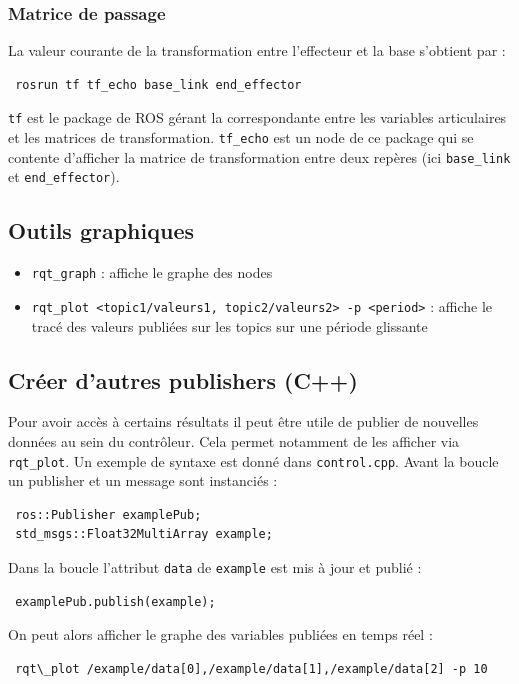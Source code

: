 \documentclass[12pt,a4paper]{article}
\begin{document}
\subsubsection*{Matrice de passage}

La valeur courante de la transformation entre l'effecteur et la base s'obtient par : 
\begin{verbatim}
 rosrun tf tf_echo base_link end_effector
\end{verbatim}
\texttt{tf} est le package de ROS gérant la correspondante entre les variables articulaires et les matrices de transformation. 
\texttt{tf\_echo} est un node de ce package qui se contente d'afficher la matrice de transformation entre deux repères (ici \texttt{base\_link} et \texttt{end\_effector}).


\subsection{Outils graphiques}
\begin{itemize}
\item \texttt{rqt\_graph} : affiche le graphe des nodes
 \item \texttt{rqt\_plot <topic1/valeurs1, topic2/valeurs2> -p <period>} : affiche le tracé des valeurs publiées sur les topics sur une période glissante
\end{itemize}

\subsection{Créer d'autres publishers (C++)}\label{sec:publish}
Pour avoir accès à certains résultats il peut être utile de publier de nouvelles données au sein du contrôleur. Cela permet notamment de les afficher via \texttt{rqt\_plot}.
Un exemple de syntaxe est donné dans \texttt{control.cpp}. Avant la boucle un publisher et un message sont instanciés :
\begin{verbatim}
 ros::Publisher examplePub;
 std_msgs::Float32MultiArray example;
\end{verbatim}Dans la boucle l'attribut \texttt{data} de \texttt{example} est mis à jour et publié :
\begin{verbatim}
 examplePub.publish(example);
\end{verbatim}On peut alors afficher le graphe des variables publiées en temps réel :
\begin{verbatim}
 rqt\_plot /example/data[0],/example/data[1],/example/data[2] -p 10
\end{verbatim}
\end{document}
